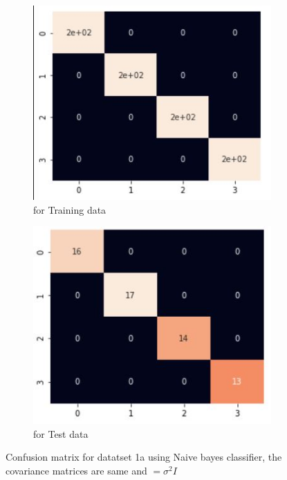 \documentclass[11pt]{article}
\begin{document}
\begin{figure}[h]
\centering
	\begin{subfigure}[b]{0.45\textwidth}
	\centering
	\includegraphics[scale=0.6]{dataset1a_nb_sigmaI_hm_train.jpg}
	\caption{for Training data}
	\label{fig:fig2.2.3.1}
	\end{subfigure}
	\hfill
	\begin{subfigure}[b]{0.45\textwidth}
	\centering
	\includegraphics[scale=0.6]{dataset1a_nb_sigmaI_hm_test.jpg}
	\caption{for Test data}
	\label{fig:fig2.2.3.2}
	\end{subfigure}
\caption{Confusion matrix for datatset 1a using Naive bayes classifier, the covariance matrices are same and $= \sigma^2 I$}
\label{fig:fig1.2.1}
\end{figure}
\end{document}
